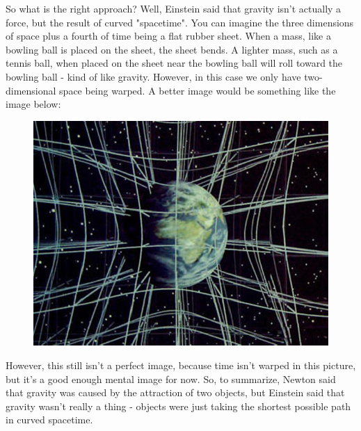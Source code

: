 So what is the right approach? Well, Einstein said that gravity isn't actually a force, but the result of curved "spacetime". You can 
imagine the three dimensions of space plus a fourth of time being a flat rubber sheet. When a mass, like a bowling ball is placed
on the sheet, the sheet bends. A lighter mass, such as a tennis ball, when placed on the sheet near the bowling ball will roll toward
the bowling ball - kind of like gravity. However, in this case we only have two-dimensional space being warped. A better image
would be something like the image below:
\begin{figure}[H]
\includegraphics[scale=0.25]{warpspace.jpg}
\end{figure}
However, this still isn't a perfect image, because time isn't warped in this picture, but it's a good enough mental image for now.
So, to summarize, Newton said that gravity was caused by the attraction of two objects, but Einstein said that gravity wasn't
really a thing - objects were just taking the shortest possible path in curved spacetime. 

